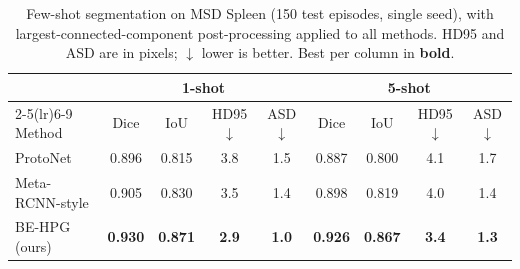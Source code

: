 \begin{table}[t]
\centering
\caption{Few-shot segmentation on MSD Spleen (150 test episodes, single seed), with largest-connected-component post-processing applied to all methods. HD95 and ASD are in pixels; $\downarrow$ lower is better. Best per column in \textbf{bold}.}
\label{tab:main}
\begin{tabular}{l cccc cccc}
\toprule
& \multicolumn{4}{c}{1-shot} & \multicolumn{4}{c}{5-shot} \\
\cmidrule(lr){2-5}\cmidrule(lr){6-9}
Method & Dice & IoU & HD95$\downarrow$ & ASD$\downarrow$ & Dice & IoU & HD95$\downarrow$ & ASD$\downarrow$ \\
\midrule
ProtoNet & 0.896 & 0.815 & 3.8 & 1.5 & 0.887 & 0.800 & 4.1 & 1.7 \\
Meta-RCNN-style & 0.905 & 0.830 & 3.5 & 1.4 & 0.898 & 0.819 & 4.0 & 1.4 \\
BE-HPG (ours) & \textbf{0.930} & \textbf{0.871} & \textbf{2.9} & \textbf{1.0} & \textbf{0.926} & \textbf{0.867} & \textbf{3.4} & \textbf{1.3} \\
\bottomrule
\end{tabular}
\end{table}
